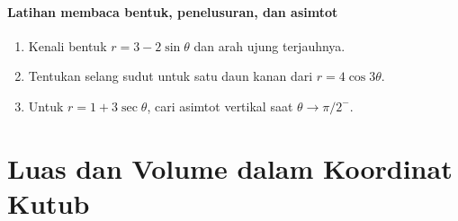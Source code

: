 \documentclass{../../kalkulus-ppt}
\begin{document}
\begin{frame}{\insertsection}
    \framesubtitle{Latihan membaca bentuk, penelusuran, dan asimtot}
    \begin{latihan}
        \begin{enumerate}
            \item Kenali bentuk $r=3-2\sin\theta$ dan arah ujung terjauhnya.
            \item Tentukan selang sudut untuk satu daun kanan dari $r=4\cos3\theta$.
            \item Untuk $r=1+3\sec\theta$, cari asimtot vertikal saat $\theta\to\pi/2^-$.
        \end{enumerate}
    \end{latihan}
\end{frame}

\section{Luas dan Volume dalam Koordinat Kutub}
\end{document}
